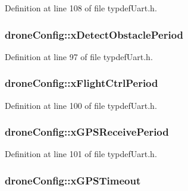 Definition at line 108 of file typdef\-Uart.\-h.

\hypertarget{structdroneConfig_ac536a237bbb15769d731ec98495d7d97}{
\subsubsection[{x\-Detect\-Obstacle\-Period}]{ drone\-Config\-::x\-Detect\-Obstacle\-Period}}\label{structdroneConfig_ac536a237bbb15769d731ec98495d7d97}


Definition at line 97 of file typdef\-Uart.\-h.

\hypertarget{structdroneConfig_a92f8e6403d9ca068830a44280239e551}{
\subsubsection[{x\-Flight\-Ctrl\-Period}]{ drone\-Config\-::x\-Flight\-Ctrl\-Period}}\label{structdroneConfig_a92f8e6403d9ca068830a44280239e551}


Definition at line 100 of file typdef\-Uart.\-h.

\hypertarget{structdroneConfig_ae0b978b5906545132a1a1a37c3ca4907}{
\subsubsection[{x\-G\-P\-S\-Receive\-Period}]{ drone\-Config\-::x\-G\-P\-S\-Receive\-Period}}\label{structdroneConfig_ae0b978b5906545132a1a1a37c3ca4907}


Definition at line 101 of file typdef\-Uart.\-h.

\hypertarget{structdroneConfig_ae272c4dd5a556fe40d2ea3105bf0aa96}{
\subsubsection[{x\-G\-P\-S\-Timeout}]{ drone\-Config\-::x\-G\-P\-S\-Timeout}}\label{structdroneConfig_ae272c4dd5a556fe40d2ea3105bf0aa96}



